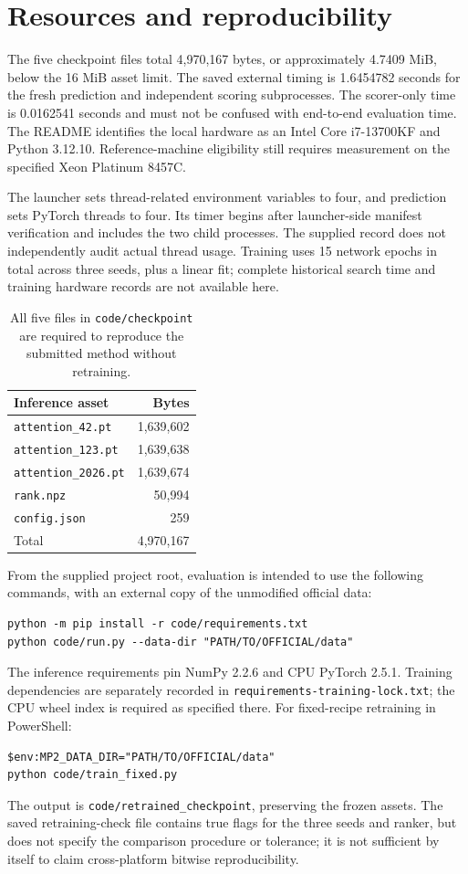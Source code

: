 \documentclass[11pt]{article}
\begin{document}
\section{Resources and reproducibility}
The five checkpoint files total 4,970,167 bytes, or approximately 4.7409 MiB, below the 16 MiB asset limit. The saved external timing is 1.6454782 seconds for the fresh prediction and independent scoring subprocesses. The scorer-only time is 0.0162541 seconds and must not be confused with end-to-end evaluation time. The README identifies the local hardware as an Intel Core i7-13700KF and Python 3.12.10. Reference-machine eligibility still requires measurement on the specified Xeon Platinum 8457C.

The launcher sets thread-related environment variables to four, and prediction sets PyTorch threads to four. Its timer begins after launcher-side manifest verification and includes the two child processes. The supplied record does not independently audit actual thread usage. Training uses 15 network epochs in total across three seeds, plus a linear fit; complete historical search time and training hardware records are not available here.

\begin{table}[ht]
\centering\small
\begin{tabular}{lr}
\toprule
Inference asset & Bytes\\
\midrule
\texttt{attention\_42.pt} & 1,639,602\\
\texttt{attention\_123.pt} & 1,639,638\\
\texttt{attention\_2026.pt} & 1,639,674\\
\texttt{rank.npz} & 50,994\\
\texttt{config.json} & 259\\
\midrule
Total & 4,970,167\\
\bottomrule
\end{tabular}
\caption{All five files in \texttt{code/checkpoint} are required to reproduce the submitted method without retraining.}
\end{table}

From the supplied project root, evaluation is intended to use the following commands, with an external copy of the unmodified official data:
\begin{verbatim}
python -m pip install -r code/requirements.txt
python code/run.py --data-dir "PATH/TO/OFFICIAL/data"
\end{verbatim}
The inference requirements pin NumPy 2.2.6 and CPU PyTorch 2.5.1. Training dependencies are separately recorded in \texttt{requirements-training-lock.txt}; the CPU wheel index is required as specified there. For fixed-recipe retraining in PowerShell:
\begin{verbatim}
$env:MP2_DATA_DIR="PATH/TO/OFFICIAL/data"
python code/train_fixed.py
\end{verbatim}
The output is \texttt{code/retrained\_checkpoint}, preserving the frozen assets. The saved retraining-check file contains true flags for the three seeds and ranker, but does not specify the comparison procedure or tolerance; it is not sufficient by itself to claim cross-platform bitwise reproducibility.
\end{document}
